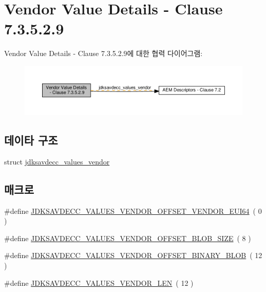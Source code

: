\hypertarget{group__values__vendor}{}\section{Vendor Value Details -\/ Clause 7.3.5.2.9}
\label{group__values__vendor}
Vendor Value Details -\/ Clause 7.3.5.2.9에 대한 협력 다이어그램\+:
\nopagebreak
\begin{figure}[H]
\begin{center}
\leavevmode
\includegraphics[width=350pt]{group__values__vendor}
\end{center}
\end{figure}
\subsection*{데이타 구조}
\begin{DoxyCompactItemize}
\item 
struct \hyperlink{structjdksavdecc__values__vendor}{jdksavdecc\+\_\+values\+\_\+vendor}
\end{DoxyCompactItemize}
\subsection*{매크로}
\begin{DoxyCompactItemize}
\item 
\#define \hyperlink{group__values__vendor_ga408d2f5fb73860bae8662b67faf86303}{J\+D\+K\+S\+A\+V\+D\+E\+C\+C\+\_\+\+V\+A\+L\+U\+E\+S\+\_\+\+V\+E\+N\+D\+O\+R\+\_\+\+O\+F\+F\+S\+E\+T\+\_\+\+V\+E\+N\+D\+O\+R\+\_\+\+E\+U\+I64}~( 0 )
\item 
\#define \hyperlink{group__values__vendor_gaddcc6082d298026a7ecfb3499d18c7f5}{J\+D\+K\+S\+A\+V\+D\+E\+C\+C\+\_\+\+V\+A\+L\+U\+E\+S\+\_\+\+V\+E\+N\+D\+O\+R\+\_\+\+O\+F\+F\+S\+E\+T\+\_\+\+B\+L\+O\+B\+\_\+\+S\+I\+ZE}~( 8 )
\item 
\#define \hyperlink{group__values__vendor_gacb84dd8a5c796d2a40d0ab02fd01fd65}{J\+D\+K\+S\+A\+V\+D\+E\+C\+C\+\_\+\+V\+A\+L\+U\+E\+S\+\_\+\+V\+E\+N\+D\+O\+R\+\_\+\+O\+F\+F\+S\+E\+T\+\_\+\+B\+I\+N\+A\+R\+Y\+\_\+\+B\+L\+OB}~( 12 )
\item 
\#define \hyperlink{group__values__vendor_ga9c664c291aa8ec431f7399f836701ca5}{J\+D\+K\+S\+A\+V\+D\+E\+C\+C\+\_\+\+V\+A\+L\+U\+E\+S\+\_\+\+V\+E\+N\+D\+O\+R\+\_\+\+L\+EN}~( 12 )
\end{DoxyCompactItemize}

